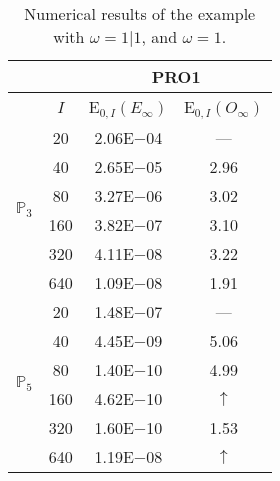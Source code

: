 \begin{table}[H]
\caption{Numerical results of the example with $\omega=1|1$, and $\omega=1$.}
\setlength{\tabcolsep}{5pt}
\centering
\begin{tabular}{@{}l c c c@{}}
\toprule
 &  & \multicolumn{2}{c}{PRO1}\\
\midrule
 & $I$ & E$_{0,I}(E_{\infty})$ & E$_{0,I}(O_{\infty})$\\
\midrule
\multirow{6}{*}{$\mathbb{P}_{3}$}
 & 20 & 2.06E$-$04 & ---\\
 & 40 & 2.65E$-$05 & 2.96\\
 & 80 & 3.27E$-$06 & 3.02\\
 & 160 & 3.82E$-$07 & 3.10\\
 & 320 & 4.11E$-$08 & 3.22\\
 & 640 & 1.09E$-$08 & 1.91\\
\midrule
\multirow{6}{*}{$\mathbb{P}_{5}$}
 & 20 & 1.48E$-$07 & ---\\
 & 40 & 4.45E$-$09 & 5.06\\
 & 80 & 1.40E$-$10 & 4.99\\
 & 160 & 4.62E$-$10 & $\uparrow$\\
 & 320 & 1.60E$-$10 & 1.53\\
 & 640 & 1.19E$-$08 & $\uparrow$\\
\bottomrule
\end{tabular}
\label{Table:PRO:test_01_01_test42_pro1}
\end{table}
